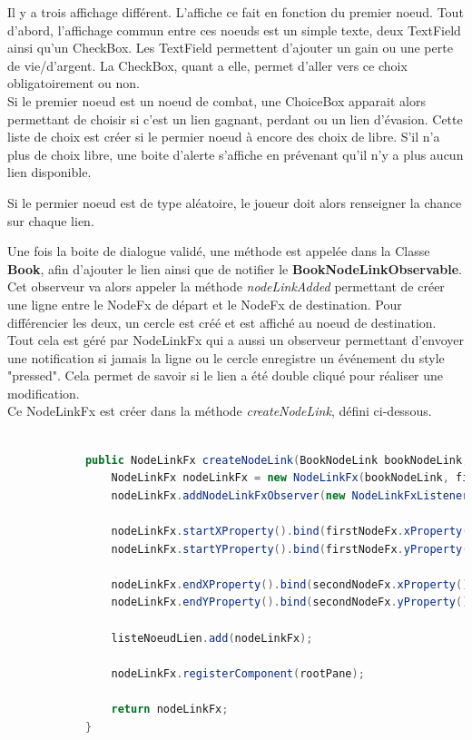 			Il y a trois affichage différent. L'affiche ce fait en fonction du premier noeud. Tout d'abord, l'affichage commun entre ces noeuds est un simple texte, deux TextField ainsi qu'un CheckBox. Les TextField permettent d'ajouter un gain ou une perte de vie/d'argent. La CheckBox, quant a elle, permet d'aller vers ce choix obligatoirement ou non.\\
			Si le premier noeud est un noeud de combat, une ChoiceBox apparait alors permettant de choisir si c'est un lien gagnant, perdant ou un lien d'évasion. Cette liste de choix est créer si le permier noeud à encore des choix de libre. S'il n'a plus de choix libre, une boite d'alerte s'affiche en prévenant qu'il n'y a plus aucun lien disponible.

			Si le permier noeud est de type aléatoire, le joueur doit alors renseigner la chance sur chaque lien.

			Une fois la boite de dialogue validé, une méthode est appelée dans la Classe \textbf{Book}, afin d'ajouter le lien ainsi que de notifier le \textbf{BookNodeLinkObservable}. Cet observeur va alors appeler la méthode \textit{nodeLinkAdded} permettant de créer une ligne entre le NodeFx de départ et le NodeFx de destination. Pour différencier les deux, un cercle est créé et est affiché au noeud de destination. Tout cela est géré par NodeLinkFx qui a aussi un observeur permettant d'envoyer une notification si jamais la ligne ou le cercle enregistre un événement du style "pressed". Cela permet de savoir si le lien a été double cliqué pour réaliser une modification.\\
			Ce NodeLinkFx est créer dans la méthode \textit{createNodeLink}, défini ci-dessous.

			\begin{lstlisting}[gobble=12, language=java, caption=Création du lien NodeLink]

			public NodeLinkFx createNodeLink(BookNodeLink bookNodeLink, NodeFx firstNodeFx, NodeFx secondNodeFx) {
				NodeLinkFx nodeLinkFx = new NodeLinkFx(bookNodeLink, firstNodeFx, secondNodeFx, zoom);
				nodeLinkFx.addNodeLinkFxObserver(new NodeLinkFxListener());

				nodeLinkFx.startXProperty().bind(firstNodeFx.xProperty().add(firstNodeFx.widthProperty().divide(2)));
				nodeLinkFx.startYProperty().bind(firstNodeFx.yProperty().add(firstNodeFx.heightProperty().divide(2)));

				nodeLinkFx.endXProperty().bind(secondNodeFx.xProperty().add(secondNodeFx.widthProperty().divide(2)));
				nodeLinkFx.endYProperty().bind(secondNodeFx.yProperty().add(secondNodeFx.heightProperty().divide(2)));

				listeNoeudLien.add(nodeLinkFx);

				nodeLinkFx.registerComponent(rootPane);

				return nodeLinkFx;
			}

			\end{lstlisting}

